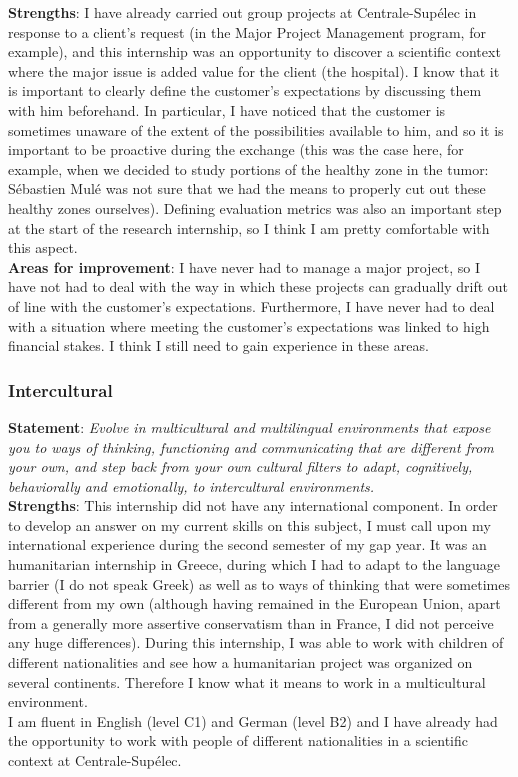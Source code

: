 \documentclass[preprint,12pt]{elsarticle}
\begin{document}
\noindent \textbf{Strengths}: I have already carried out group projects at Centrale-Supélec in response to a client's request (in the Major Project Management program, for example), and this internship was an opportunity to discover a scientific context where the major issue is added value for the client (the hospital). I know that it is important to clearly define the customer's expectations by discussing them with him beforehand. In particular, I have noticed that the customer is sometimes unaware of the extent of the possibilities available to him, and so it is important to be proactive during the exchange (this was the case here, for example, when we decided to study portions of the healthy zone in the tumor: Sébastien Mulé was not sure that we had the means to properly cut out these healthy zones ourselves). Defining evaluation metrics was also an important step at the start of the research internship, so I think I am pretty comfortable with this aspect.\\[3 pt]

\noindent \textbf{Areas for improvement}: I have never had to manage a major project, so I have not had to deal with the way in which these projects can gradually drift out of line with the customer's expectations. Furthermore, I have never had to deal with a situation where meeting the customer's expectations was linked to high financial stakes. I think I still need to gain experience in these areas.

\subsubsection{Intercultural}

\noindent \textbf{Statement}: \textit{ Evolve in multicultural and multilingual environments that expose you to ways of thinking, functioning and communicating that are different from your own, and step back from your own cultural filters to adapt, cognitively, behaviorally and emotionally, to intercultural environments.}\\[3 pt]

\noindent \textbf{Strengths}: This internship did not have any international component. In order to develop an answer on my current skills on this subject, I must call upon my international experience during the second semester of my gap year. It was an humanitarian internship in Greece, during which I had to adapt to the language barrier (I do not speak Greek) as well as to ways of thinking that were sometimes different from my own (although having remained in the European Union, apart from a generally more assertive conservatism than in France, I did not perceive any huge differences). During this internship, I was able to work with children of different nationalities and see how a humanitarian project was organized on several continents. Therefore I know what it means to work in a multicultural environment.\\
\indent I am fluent in English (level C1) and German (level B2) and I have already had the opportunity to work with people of different nationalities in a scientific context at Centrale-Supélec.\\[3 pt] 
\end{document}
